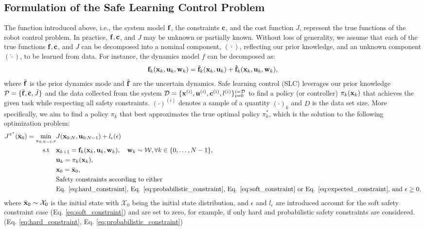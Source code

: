 \documentclass{article}
\begin{document}
\subsection{Formulation of the Safe Learning Control Problem}
The function introduced above, i.e., the system model $\mathbf{f}$, the constraints $\mathbf{c}$, and the cost function $J$, represent the true functions of the robot control problem.
In practice, $\mathbf{f}, \mathbf{c}$, and $J$ may be unknown or partially known.
Without loss of generality, we assume that each of the true functions $\mathbf{f}, \mathbf{c}$, and $J$ can be decomposed into a nominal component, $(\bar{\cdot})$, reflecting our prior knowledge, and an unknown component $(\hat{\cdot})$, to be learned from data.
For instance, the dynamics model $f$ can be decomposed as:
\begin{equation}
    \mathbf{f}_k(\mathbf{x}_k, \mathbf{u}_k, \mathbf{w}_k) = \bar{\mathbf{f}}_k(\mathbf{x}_k, \mathbf{u}_k) + \hat{\mathbf{f}}_k(\mathbf{x}_k, \mathbf{u}_k, \mathbf{w}_k),
\end{equation}
where $\bar{\mathbf{f}}$ is the prior dynamics mode and $\hat{\mathbf{f}}$ are the uncertain dynamics.
Safe learning control (SLC) leverages our prior knowledge $\mathcal{P} = \{\bar{\mathbf{f}}, \bar{\mathbf{c}}, \bar{J} \}$ and the data collected from the system $\mathcal{D} = \{\mathbf{x}^{(i)}, \mathbf{u}^{(i)}, \mathbf{c}^{(i)}, l^{(i)} \}^{i = \mathcal{D}}_{i = 0}$ to find a policy (or controller) $\pi_k(\mathbf{x}_k)$ that achieves the given task while respecting all safety constraints.
$(\cdot)^{(i)}$ denotes a sample  of a quantity $(\cdot)_k$ and $D$ is the data set size.
More specifically, we aim to find a policy $\pi_k$ that best approximates the true optimal policy $\pi^*_k$, which is the solution to the following optimization problem:
\begin{equation}
    \begin{aligned}
        J^{\pi^*}(\bar{\mathbf{x}}_0) 
        = \min_{\pi_{0:N -1}, \epsilon} &J(\mathbf{x}_{0:N}, \mathbf{u}_{0:N - 1}) + l_\epsilon(\epsilon) \\
        \text{s.t} \quad &\mathbf{x}_{k + 1}  = \mathbf{f}_k(\mathbf{x}_k, \mathbf{u}_k, \mathbf{w}_k), \quad \mathbf{w}_k \sim \mathcal{W}, \forall k \in \{0, \ldots, N - 1\}, \\
        & \mathbf{u}_k = \pi_k(\mathbf{x}_k),  \\
        & \mathbf{x}_0 = \bar{\mathbf{x}}_0, \\
        & \text{Safety constraints according to either} \\
        & \text{Eq. \eqref{eq:hard_constraint}, Eq. \eqref{eq:probabilistic_constraint}, Eq. \eqref{eq:soft_constraint} or Eq. \eqref{eq:expected_constraint}, and } \epsilon \geq 0, \\
    \end{aligned}
\end{equation}
where $\bar{\mathbf{x}}_0 \sim \mathcal{X}_0$ is the initial state with $\mathcal{X}_0$ being the initial state distribution, and $\epsilon$ and $l_\epsilon$ are introduced account for the soft safety constraint case (Eq. \eqref{eq:soft_constraint}) and are set to zero, for example, if only hard and probabilistic safety constraints are considered. (Eq. \eqref{eq:hard_constraint}, Eq. \eqref{eq:probabilistic_constraint})
\end{document}
